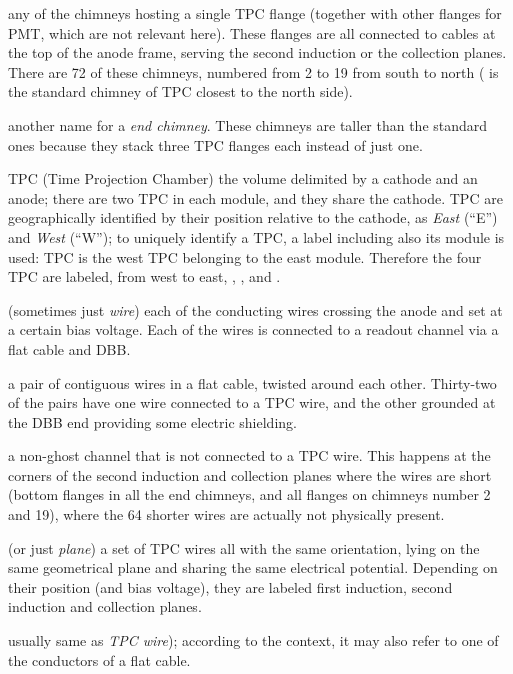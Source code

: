 \begin{description}
  \item[Standard chimney]
    any of the chimneys hosting a single TPC flange (together with other flanges
    for PMT, which are not relevant here). These flanges are all connected to
    cables at the top of the anode frame, serving the second induction or the
    collection planes. There are 72 of these chimneys,
    numbered from 2 to 19 from south to north (\eg {} is the
    standard chimney of TPC  closest to the north side).

  \item[Tall chimney]
    another name for a \emph{end chimney}. These chimneys are taller than the
    standard ones because they stack three TPC flanges each instead of just one.

  \item{TPC}
    (Time Projection Chamber) the volume delimited by a cathode and an
    anode; there are two TPC in each module, and they share the cathode.
    TPC are geographically identified by their position relative to the cathode,
    as \emph{East} (``E'') and \emph{West} (``W''); to uniquely identify a TPC,
    a label including also its module is used: TPC  is the west TPC
    belonging to the east module. Therefore the four TPC are labeled, from west
    to east, , ,  and .

  \item[TPC wire]
    (sometimes just \emph{wire}) each of the conducting wires
    crossing the anode and set at a certain bias voltage.
    Each of the wires is connected to a readout channel via a flat cable and DBB.

  \item[Twisted pair]
    a pair of contiguous wires in a flat cable, twisted around
    each other. Thirty-two of the pairs have one wire connected to a TPC wire,
    and the other grounded at the DBB end providing some electric shielding.

  \item[Wireless channel]
    a non-ghost channel that is not connected to a TPC wire.
    This happens at the corners of the second induction and collection planes
    where the wires are short (bottom flanges in all the end chimneys, and all
    flanges on chimneys number 2 and 19), where the 64 shorter wires are
    actually not physically present.
  
  \item[Wire plane]
    (or just \emph{plane}) a set of TPC wires all with the same
    orientation, lying on the same geometrical plane and sharing the same
    electrical potential.
    Depending on their position (and bias voltage), they are labeled first
    induction, second induction and collection planes.

  \item[Wire]
    usually same as \emph{TPC wire}); according to the context,
    it may also refer to one of the conductors of a flat cable.

\end{description}

